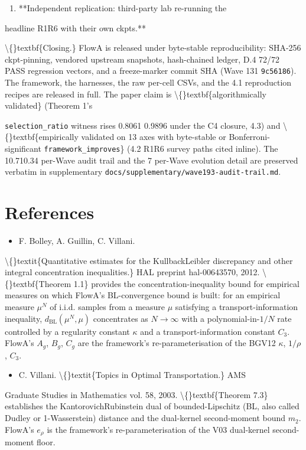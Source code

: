 \documentclass[preprint,3p,times,twocolumn]{elsarticle}
\begin{document}
\begin{enumerate}
\item **Independent replication: third-party lab re-running the
\end{enumerate}
headline R1R6 with their own ckpts.**

\textbackslash\{\}textbf\{Closing.\} FlowA is released under byte-stable reproducibility: SHA-256 ckpt-pinning, vendored upstream snapshots, hash-chained ledger, D.4 72/72 PASS regression vectors, and a freeze-marker commit SHA (Wave 131 \texttt{9c56186}). The framework, the harnesses, the raw per-cell CSVs, and the 4.1 reproduction recipes are released in full. The paper claim is \textbackslash\{\}textbf\{algorithmically validated\} (Theorem 1's

\texttt{selection\_ratio} witness rises 0.8061  0.9896 under the C4 closure, 4.3) and \textbackslash\{\}textbf\{empirically validated on 13 axes with byte-stable or Bonferroni-significant \texttt{framework\_improves}\} (4.2 R1R6 survey paths cited inline). The 10.710.34 per-Wave audit trail and the 7 per-Wave evolution detail are preserved verbatim in supplementary \texttt{docs/supplementary/wave193-audit-trail.md}.

\section*{References}
\small
\begin{itemize}
\item [BolleyGuilinVillani 2012] F. Bolley, A. Guillin, C. Villani.
\end{itemize}
\textbackslash\{\}textit\{Quantitative estimates for the KullbackLeibler discrepancy and other integral concentration inequalities.\} HAL preprint hal-00643570, 2012. \textbackslash\{\}textbf\{Theorem 1.1\} provides the concentration-inequality bound for empirical measures on which FlowA's BL-convergence bound is built: for an empirical measure $\mu^N$ of i.i.d. samples from a measure $\mu$ satisfying a transport-information inequality, $d_{\mathrm{BL}}(\mu^N, \mu)$ concentrates as $N \to \infty$ with a polynomial-in-$1/N$ rate controlled by a regularity constant $\kappa$ and a transport-information constant $C_3$. FlowA's $A_g$, $B_g$, $C_g$ are the framework's re-parameterisation of the BGV12 $\kappa$, $1/\rho$, $C_3$.

\begin{itemize}
\item [Villani 2003] C. Villani. \textbackslash\{\}textit\{Topics in Optimal Transportation.\} AMS
\end{itemize}
Graduate Studies in Mathematics vol. 58, 2003. \textbackslash\{\}textbf\{Theorem 7.3\} establishes the KantorovichRubinstein dual of bounded-Lipschitz (BL, also called Dudley or 1-Wasserstein) distance and the dual-kernel second-moment bound $m_2$. FlowA's $e_\rho$ is the framework's re-parameterisation of the V03 dual-kernel second-moment floor.
\end{document}
